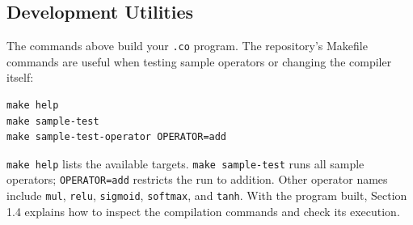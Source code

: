 \subsection*{Development Utilities}

The commands above build your \texttt{.co} program. The repository's Makefile commands are useful when testing sample operators or changing the compiler itself:

\begin{lstlisting}[language={},caption={Testing sample operators}]
make help
make sample-test
make sample-test-operator OPERATOR=add
\end{lstlisting}

\texttt{make help} lists the available targets. \texttt{make sample-\allowbreak{}test} runs all sample operators; \texttt{OPERATOR=add} restricts the run to addition. Other operator names include \texttt{mul}, \texttt{relu}, \texttt{sigmoid}, \texttt{softmax}, and \texttt{tanh}. With the program built, Section 1.4 explains how to inspect the compilation commands and check its execution.
